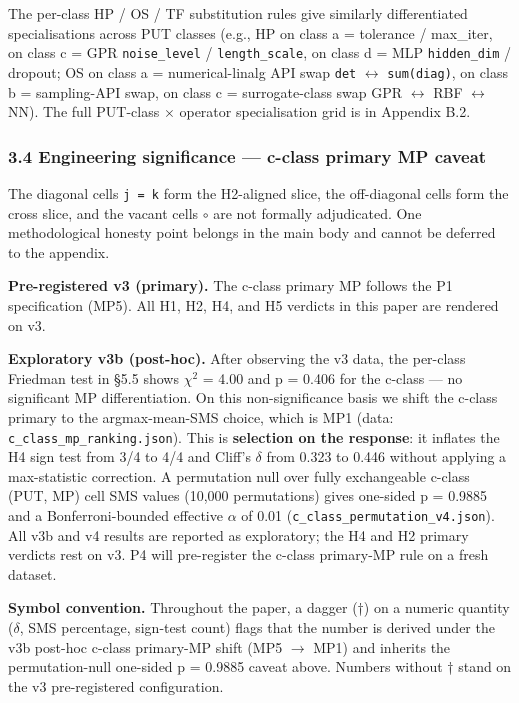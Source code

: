 \documentclass[review,12pt,authoryear]{elsarticle}
\begin{document}
The per-class HP / OS / TF substitution rules give similarly
differentiated specialisations across PUT classes (e.g., HP on class a =
tolerance / max\_iter, on class c = GPR \texttt{noise\_level} /
\texttt{length\_scale}, on class d = MLP \texttt{hidden\_dim} / dropout;
OS on class a = numerical-linalg API swap \texttt{det} $\leftrightarrow$
\texttt{sum(diag)}, on class b = sampling-API swap, on class c =
surrogate-class swap GPR $\leftrightarrow$ RBF $\leftrightarrow$ NN). The full PUT-class $\times$ operator
specialisation grid is in Appendix B.2.

\subsubsection{3.4 Engineering significance --- c-class primary MP
caveat}\label{engineering-significance-c-class-primary-mp-caveat}

The diagonal cells \texttt{j\ =\ k} form the H2-aligned slice, the
off-diagonal cells form the cross slice, and the vacant cells \texttt{$\circ$}
are not formally adjudicated. One methodological honesty point belongs
in the main body and cannot be deferred to the appendix.

\textbf{Pre-registered v3 (primary).} The c-class primary MP follows the
P1 specification (MP5). All H1, H2, H4, and H5 verdicts in this paper
are rendered on v3.

\textbf{Exploratory v3b (post-hoc).} After observing the v3 data, the
per-class Friedman test in §5.5 shows $\chi$$^{2}$ = 4.00 and p = 0.406 for the
c-class --- no significant MP differentiation. On this non-significance
basis we shift the c-class primary to the argmax-mean-SMS choice, which
is MP1 (data: \texttt{c\_class\_mp\_ranking.json}). This is
\textbf{selection on the response}: it inflates the H4 sign test from
3/4 to 4/4 and Cliff's $\delta$ from 0.323 to 0.446 without applying a
max-statistic correction. A permutation null over fully exchangeable
c-class (PUT, MP) cell SMS values (10,000 permutations) gives one-sided
p = 0.9885 and a Bonferroni-bounded effective $\alpha$ of 0.01
(\texttt{c\_class\_permutation\_v4.json}). All v3b and v4 results are
reported as exploratory; the H4 and H2 primary verdicts rest on v3. P4
will pre-register the c-class primary-MP rule on a fresh dataset.

\textbf{Symbol convention.} Throughout the paper, a dagger (†) on a
numeric quantity ($\delta$, SMS percentage, sign-test count) flags that the
number is derived under the v3b post-hoc c-class primary-MP shift (MP5 $\to$
MP1) and inherits the permutation-null one-sided p = 0.9885 caveat
above. Numbers without † stand on the v3 pre-registered configuration.
\end{document}
